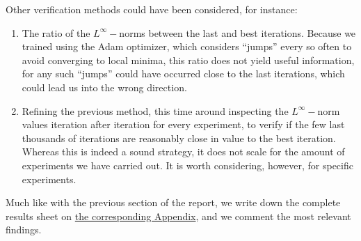 \documentclass[12pt]{report} %
\begin{document}
Other verification methods could have been considered, for instance:
\begin{enumerate}
  \item The ratio of the $L^\infty-$norms between the last and best iterations. Because we trained using the Adam optimizer, which considers ``jumps'' every so often to avoid converging to local minima, this ratio does not yield useful information, for any such ``jumps'' could have occurred close to the last iterations, which could lead us into the wrong direction.
  \item Refining the previous method, this time around inspecting the $L^\infty-$norm values iteration after iteration for every experiment, to verify if the few last thousands of iterations are reasonably close in value to the best iteration. Whereas this is indeed a sound strategy, it does not scale for the amount of experiments we have carried out. %
        It is worth considering, however, for specific experiments. \label{option-method}
\end{enumerate}

Much like with the previous section of the report, we write down the complete results sheet on \hyperref[appendix-1d]{the corresponding Appendix}, and we comment the most relevant findings. 




\end{document}
